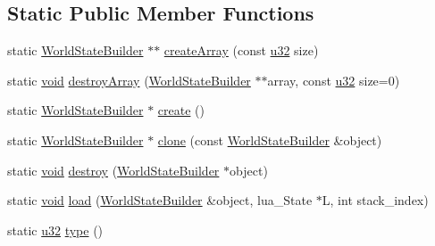 \subsection*{Static Public Member Functions}
\begin{DoxyCompactItemize}
\item 
static \mbox{\hyperlink{classnjli_1_1_world_state_builder}{World\+State\+Builder}} $\ast$$\ast$ \mbox{\hyperlink{classnjli_1_1_world_state_builder_a5acea112eba6514219c5be05ea03664b}{create\+Array}} (const \mbox{\hyperlink{_util_8h_a10e94b422ef0c20dcdec20d31a1f5049}{u32}} size)
\item 
static \mbox{\hyperlink{_thread_8h_af1e856da2e658414cb2456cb6f7ebc66}{void}} \mbox{\hyperlink{classnjli_1_1_world_state_builder_a7204d3b1c14985240e80902f4a701412}{destroy\+Array}} (\mbox{\hyperlink{classnjli_1_1_world_state_builder}{World\+State\+Builder}} $\ast$$\ast$array, const \mbox{\hyperlink{_util_8h_a10e94b422ef0c20dcdec20d31a1f5049}{u32}} size=0)
\item 
static \mbox{\hyperlink{classnjli_1_1_world_state_builder}{World\+State\+Builder}} $\ast$ \mbox{\hyperlink{classnjli_1_1_world_state_builder_a171cf071f02204ca6a87eb6a417da4f9}{create}} ()
\item 
static \mbox{\hyperlink{classnjli_1_1_world_state_builder}{World\+State\+Builder}} $\ast$ \mbox{\hyperlink{classnjli_1_1_world_state_builder_aa5ab40b1e0b5fbb41fa8d418dac235a9}{clone}} (const \mbox{\hyperlink{classnjli_1_1_world_state_builder}{World\+State\+Builder}} \&object)
\item 
static \mbox{\hyperlink{_thread_8h_af1e856da2e658414cb2456cb6f7ebc66}{void}} \mbox{\hyperlink{classnjli_1_1_world_state_builder_acfd409fa70a10bdcd8d7d9525fe98574}{destroy}} (\mbox{\hyperlink{classnjli_1_1_world_state_builder}{World\+State\+Builder}} $\ast$object)
\item 
static \mbox{\hyperlink{_thread_8h_af1e856da2e658414cb2456cb6f7ebc66}{void}} \mbox{\hyperlink{classnjli_1_1_world_state_builder_a44a7c4e10e661e24bef7997e927af8ad}{load}} (\mbox{\hyperlink{classnjli_1_1_world_state_builder}{World\+State\+Builder}} \&object, lua\+\_\+\+State $\ast$L, int stack\+\_\+index)
\item 
static \mbox{\hyperlink{_util_8h_a10e94b422ef0c20dcdec20d31a1f5049}{u32}} \mbox{\hyperlink{classnjli_1_1_world_state_builder_a8aa60769d6ddf964215171b23ac08d4f}{type}} ()
\end{DoxyCompactItemize}
